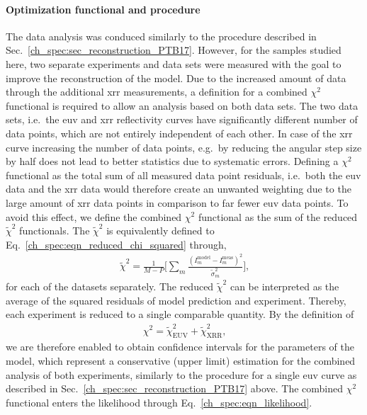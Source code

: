 \paragraph{Optimization functional and procedure} 
The data analysis was conduced similarly to the procedure described in Sec.~\ref{ch_spec:sec_reconstruction_PTB17}. However, for the samples studied here, two separate experiments and data sets were measured with the goal to improve the reconstruction of the model. Due to the increased amount of data through the additional \gls{xrr} measurements, a definition for a combined $\chi^2$ functional is required to allow an analysis based on both data sets. The two data sets, i.e.~the \gls{euv} and \gls{xrr} reflectivity curves have significantly different number of data points, which are not entirely independent of each other. In case of the \gls{xrr} curve increasing the number of data points, e.g.~by reducing the angular step size by half does not lead to better statistics due to systematic errors. Defining a $\chi^2$ functional as the total sum of all measured data point residuals, i.e.~both the \gls{euv} data and the \gls{xrr} data would therefore create an unwanted weighting due to the large amount of \gls{xrr} data points in comparison to far fewer \gls{euv} data points. To avoid this effect, we define the combined $\chi^2$ functional as the sum of the reduced $\tilde{\chi}^2$ functionals. The $\tilde{\chi}^2$ is equivalently defined to Eq.~\eqref{ch_spec:eqn_reduced_chi_squared} through,\begin{align}
\tilde{\chi}^2 = \frac{1}{M-P} \bigg[\sum\limits_{m} \frac{(I_m^\text{model} 
- I_m^\text{meas})^2}{\tilde{\sigma}_m^2} \bigg] \text{,}
\end{align}
for each of the datasets separately. The reduced $\tilde{\chi}^2$ can be interpreted as the average of the squared residuals of model prediction and experiment. Thereby, each experiment is reduced to a single comparable quantity. By the definition of
\begin{align}
\chi^2 = \tilde{\chi}^2_\text{EUV} +\tilde{\chi}^2_\text{XRR} \text{,}
\label{ch_spec:eqn_Mo_Si_C_total_chi_2}
\end{align}
we are therefore enabled to obtain confidence intervals for the parameters of the model, which represent a conservative (upper limit) estimation for the combined analysis of both experiments, similarly to the procedure for a single \gls{euv} curve as described in Sec.~\ref{ch_spec:sec_reconstruction_PTB17} above. The combined $\chi^2$ functional enters the likelihood through Eq.~\ref{ch_spec:eqn_likelihood}.

